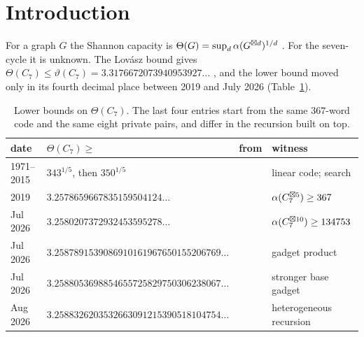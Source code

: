 \section{Introduction}
\label{sec:intro}

For a graph $G$ the Shannon capacity is $\Theta(G)=\sup_d \alpha(G^{\boxtimes d})^{1/d}$
\cite{shannon1956}. For the seven-cycle it is unknown. The Lov\'asz bound gives
$\Theta(C_7)\le\vartheta(C_7)=3.3176672073940953927\ldots$ \cite{lovasz1979}, and the lower
bound moved only in its fourth decimal place between 2019 and July 2026 (Table~\ref{tab:chain}).

\begin{table}[t]
\centering\footnotesize\setlength{\tabcolsep}{3pt}
\begin{tabular}{@{}llll@{}}
\toprule
date & $\Theta(C_7)\ge$ & from & witness \\
\midrule
1971--2015 & $343^{1/5}$, then $350^{1/5}$ & \cite{baumert1971,mathew2017} & linear code; search \\
2019 & $3.2578659667835159504124\ldots$ & \cite{polak2019} & $\alpha(C_7^{\boxtimes 5})\ge 367$ \\
Jul 2026 & $3.2580207372932453595278\ldots$ & \cite{itty2026} & $\alpha(C_7^{\boxtimes 10})\ge 134753$ \\
Jul 2026 & $3.2587891539086910161967650155206769\ldots$ & \cite{gao2026} & gadget product \\
Jul 2026 & $3.2588053698854655725829750306238067\ldots$ & \cite{bpz2026} & stronger base gadget \\
Aug 2026 & $3.2588326203532663091215390518104754\ldots$ & \cite{tandon2026} & heterogeneous recursion \\
\bottomrule
\end{tabular}
\caption{Lower bounds on $\Theta(C_7)$. The last four entries start from the same $367$-word
code and the same eight private pairs, and differ in the recursion built on top.}
\label{tab:chain}
\end{table}

